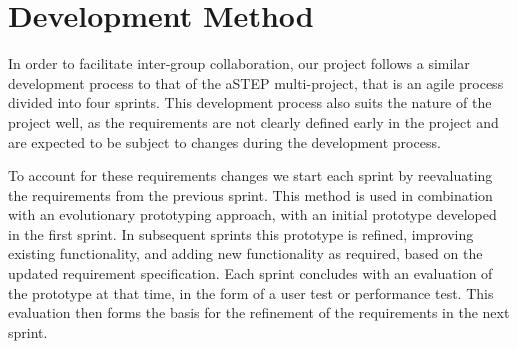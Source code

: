 \section{Development Method} \label{sec:dev_method}
In order to facilitate inter-group collaboration, our project follows a similar development process to that of the aSTEP multi-project, that is an agile process divided into four sprints. This development process also suits the nature of the project well, as the requirements are not clearly defined early in the project and are expected to be subject to changes during the development process. 

To account for these requirements changes we start each sprint by reevaluating the requirements from the previous sprint. This method is used in combination with an evolutionary prototyping approach, with an initial prototype developed in the first sprint. In subsequent sprints this prototype is refined, improving existing functionality, and adding new functionality as required, based on the updated requirement specification. Each sprint concludes with an evaluation of the prototype at that time, in the form of a user test or performance test. This evaluation then forms the basis for the refinement of the requirements in the next sprint. 

